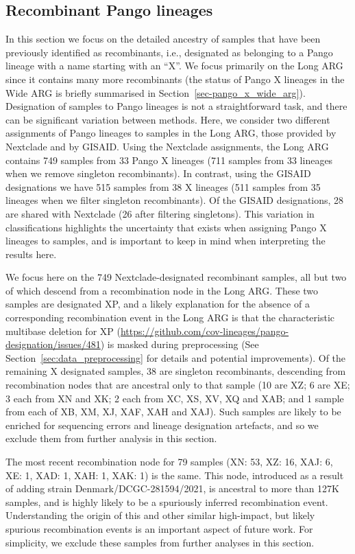 \documentclass{article}
\begin{document}
\subsection{Recombinant Pango lineages}
\label{sec:pango_x_lineages}
In this section we focus on the detailed ancestry of samples that have been
previously identified as recombinants, i.e., designated as belonging
to a Pango lineage with a name starting with an ``X''.
We focus primarily on the Long ARG
since it contains many more recombinants (the status
of Pango X lineages in the Wide ARG is briefly
summarised in Section~\ref{sec-pango_x_wide_arg}).
Designation of samples to Pango lineages is not a straightforward task,
and there can be significant variation between methods.
Here, we consider two different assignments of Pango lineages to samples in
the Long ARG, those provided by Nextclade and by GISAID.
Using the Nextclade assignments, the Long ARG contains 749 samples from
33 Pango X lineages (711 samples from 33 lineages when we
remove singleton recombinants).
In contrast, using the GISAID designations we
have 515 samples from 38 X lineages
(511 samples from 35 lineages when we filter singleton recombinants). Of the GISAID designations,
28 are shared with Nextclade (26 after filtering singletons).
This variation in classifications highlights the uncertainty that exists when
assigning Pango X lineages to samples, and is important to keep in mind
when interpreting the results here.

We focus here on the 749 Nextclade-designated recombinant samples, all
but two of which descend from a recombination node in the Long ARG.
These two samples are designated XP, and a likely
explanation for the absence of a corresponding recombination event in the Long ARG
is that the characteristic multibase deletion for XP
(\url{https://github.com/cov-lineages/pango-designation/issues/481}) is masked
during preprocessing (See Section~\ref{sec:data_preprocessing} for details and potential
improvements). Of the remaining X designated samples, 38 are singleton recombinants,
descending
from recombination nodes that are ancestral only to that sample (10 are XZ; 6
are XE;  3 each from XN and XK; 2 each from XC, XS, XV, XQ and XAB; and 1
sample from each of XB, XM, XJ, XAF, XAH and XAJ). Such samples are likely to
be enriched for sequencing errors and lineage designation artefacts, and so we
exclude them from further analysis in this section.

The most recent recombination node for 79 samples (XN: 53, XZ: 16, XAJ: 6, XE:
1, XAD: 1, XAH: 1, XAK: 1) is the same. This node, introduced as a
result of adding strain
Denmark/DCGC-281594/2021, is ancestral to more than 127K samples,
and is highly likely to be a spuriously inferred recombination event.
Understanding the origin of this
and other similar high-impact, but likely spurious recombination
events is an important aspect of future work.
For simplicity, we exclude these samples from further analyses in
this section.
\end{document}
